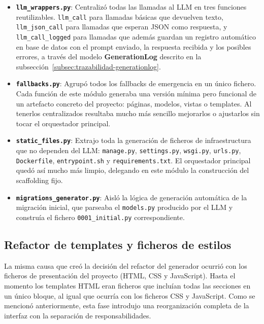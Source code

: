 \begin{itemize}
    \item \textbf{\texttt{llm\_wrappers.py}}: Centralizó todas las llamadas 
    al LLM en tres funciones reutilizables. \texttt{llm\_call} para llamadas 
    básicas que devuelven texto, \texttt{llm\_json\_call} para llamadas que 
    esperan JSON como respuesta, y \texttt{llm\_call\_logged} para llamadas 
    que además guardan un registro automático en base de datos con el prompt 
    enviado, la respuesta recibida y los posibles errores, a través del modelo 
    \textbf{GenerationLog} descrito en la 
    subsección~\ref{subsec:trazabilidad-generationlog}.

    \item \textbf{\texttt{fallbacks.py}}: Agrupó todos los fallbacks de 
    emergencia en un único fichero. Cada función de este módulo generaba una 
    versión mínima pero funcional de un artefacto concreto del proyecto: 
    páginas, modelos, vistas o templates. Al tenerlos centralizados resultaba 
    mucho más sencillo mejorarlos o ajustarlos sin tocar el orquestador principal.

    \item \textbf{\texttt{static\_files.py}}: Extrajo toda la generación de 
    ficheros de infraestructura que no dependen del LLM: \texttt{manage.py}, 
    \texttt{settings.py}, \texttt{wsgi.py}, \texttt{urls.py}, \texttt{Dockerfile}, 
    \texttt{entrypoint.sh} y \texttt{requirements.txt}. El orquestador principal 
    quedó así mucho más limpio, delegando en este módulo la construcción del 
    scaffolding fijo.

    \item \textbf{\texttt{migrations\_generator.py}}: Aisló la lógica de 
    generación automática de la migración inicial, que parseaba el 
    \texttt{models.py} producido por el LLM y construía el fichero 
    \texttt{0001\_initial.py} correspondiente.
\end{itemize}

\subsection{Refactor de templates y ficheros de estilos}
\label{subsec:refactor-templates-estilos}

La misma causa que creó la decisión del refactor del generador ocurrió con los ficheros de presentación del proyecto (HTML, CSS y JavaScript).
Hasta el momento los templates HTML eran ficheros que incluían todas las secciones en un único bloque, al igual que ocurría con los ficheros CSS y JavaScript. Como se mencionó anteriormente, esta fase introdujo una reorganización completa de la interfaz con la separación de responsabilidades.

